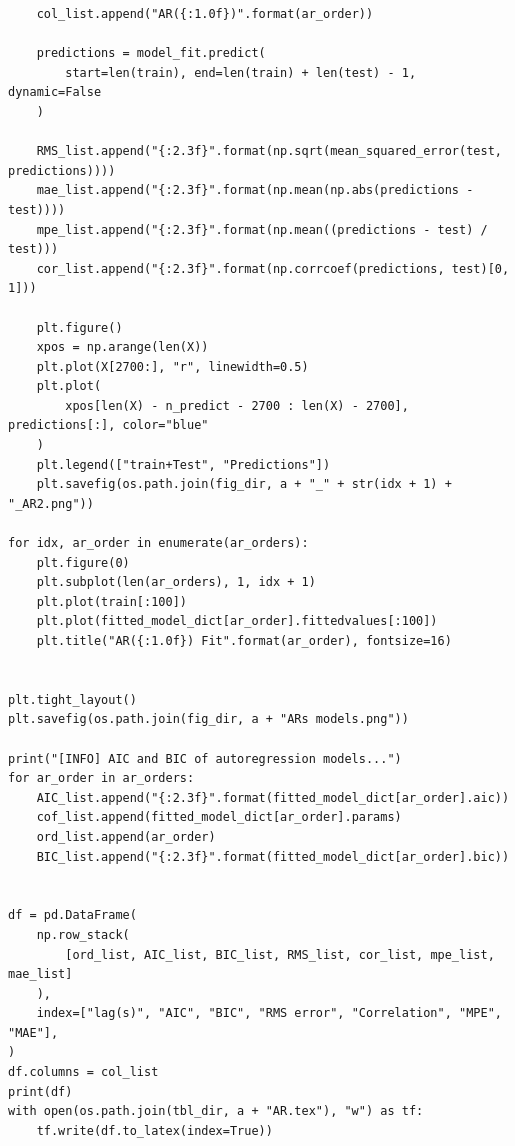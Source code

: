 \documentclass[12pt]{article}
\begin{document}
\begin{lstlisting}
    col_list.append("AR({:1.0f})".format(ar_order))

    predictions = model_fit.predict(
        start=len(train), end=len(train) + len(test) - 1, dynamic=False
    )

    RMS_list.append("{:2.3f}".format(np.sqrt(mean_squared_error(test, predictions))))
    mae_list.append("{:2.3f}".format(np.mean(np.abs(predictions - test))))
    mpe_list.append("{:2.3f}".format(np.mean((predictions - test) / test)))
    cor_list.append("{:2.3f}".format(np.corrcoef(predictions, test)[0, 1]))

    plt.figure()
    xpos = np.arange(len(X))
    plt.plot(X[2700:], "r", linewidth=0.5)
    plt.plot(
        xpos[len(X) - n_predict - 2700 : len(X) - 2700], predictions[:], color="blue"
    )
    plt.legend(["train+Test", "Predictions"])
    plt.savefig(os.path.join(fig_dir, a + "_" + str(idx + 1) + "_AR2.png"))

for idx, ar_order in enumerate(ar_orders):
    plt.figure(0)
    plt.subplot(len(ar_orders), 1, idx + 1)
    plt.plot(train[:100])
    plt.plot(fitted_model_dict[ar_order].fittedvalues[:100])
    plt.title("AR({:1.0f}) Fit".format(ar_order), fontsize=16)


plt.tight_layout()
plt.savefig(os.path.join(fig_dir, a + "ARs models.png"))

print("[INFO] AIC and BIC of autoregression models...")
for ar_order in ar_orders:
    AIC_list.append("{:2.3f}".format(fitted_model_dict[ar_order].aic))
    cof_list.append(fitted_model_dict[ar_order].params)
    ord_list.append(ar_order)
    BIC_list.append("{:2.3f}".format(fitted_model_dict[ar_order].bic))


df = pd.DataFrame(
    np.row_stack(
        [ord_list, AIC_list, BIC_list, RMS_list, cor_list, mpe_list, mae_list]
    ),
    index=["lag(s)", "AIC", "BIC", "RMS error", "Correlation", "MPE", "MAE"],
)
df.columns = col_list
print(df)
with open(os.path.join(tbl_dir, a + "AR.tex"), "w") as tf:
    tf.write(df.to_latex(index=True))
\end{lstlisting}
\end{document}

